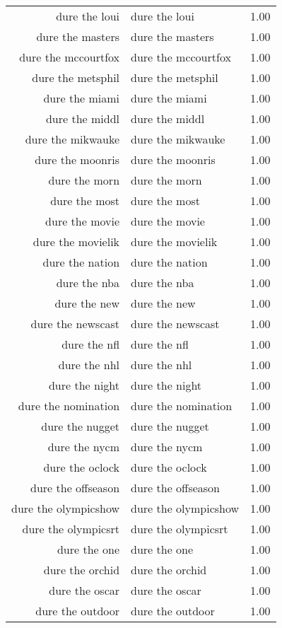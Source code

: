 \begin{table}[ht]
\begin{tabular}{rlr}
  dure the loui & dure the loui & 1.00 \\ 
  dure the masters & dure the masters & 1.00 \\ 
  dure the mccourtfox & dure the mccourtfox & 1.00 \\ 
  dure the metsphil & dure the metsphil & 1.00 \\ 
  dure the miami & dure the miami & 1.00 \\ 
  dure the middl & dure the middl & 1.00 \\ 
  dure the mikwauke & dure the mikwauke & 1.00 \\ 
  dure the moonris & dure the moonris & 1.00 \\ 
  dure the morn & dure the morn & 1.00 \\ 
  dure the most & dure the most & 1.00 \\ 
  dure the movie & dure the movie & 1.00 \\ 
  dure the movielik & dure the movielik & 1.00 \\ 
  dure the nation & dure the nation & 1.00 \\ 
  dure the nba & dure the nba & 1.00 \\ 
  dure the new & dure the new & 1.00 \\ 
  dure the newscast & dure the newscast & 1.00 \\ 
  dure the nfl & dure the nfl & 1.00 \\ 
  dure the nhl & dure the nhl & 1.00 \\ 
  dure the night & dure the night & 1.00 \\ 
  dure the nomination & dure the nomination & 1.00 \\ 
  dure the nugget & dure the nugget & 1.00 \\ 
  dure the nycm & dure the nycm & 1.00 \\ 
  dure the oclock & dure the oclock & 1.00 \\ 
  dure the offseason & dure the offseason & 1.00 \\ 
  dure the olympicshow & dure the olympicshow & 1.00 \\ 
  dure the olympicsrt & dure the olympicsrt & 1.00 \\ 
  dure the one & dure the one & 1.00 \\ 
  dure the orchid & dure the orchid & 1.00 \\ 
  dure the oscar & dure the oscar & 1.00 \\ 
  dure the outdoor & dure the outdoor & 1.00 \\ 

\end{tabular}
\end{table}
